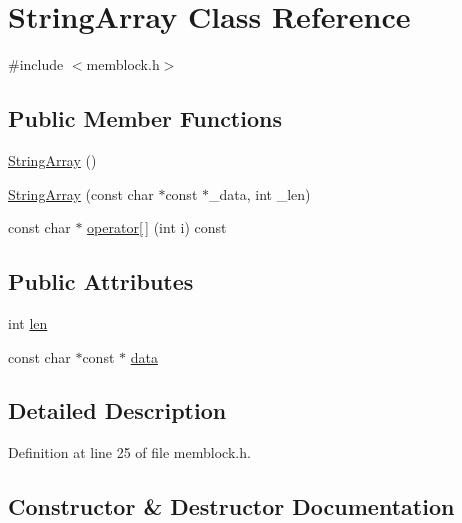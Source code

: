 \hypertarget{class_string_array}{}\section{String\+Array Class Reference}
\label{class_string_array}


{\ttfamily \#include $<$memblock.\+h$>$}

\subsection*{Public Member Functions}
\begin{DoxyCompactItemize}
\item 
\hyperlink{class_string_array_a02f4a1dc1bc63b44c4aeafe174b3b681}{String\+Array} ()
\item 
\hyperlink{class_string_array_acfcc664e8488524390d9e2b9f7eacc60}{String\+Array} (const char $\ast$const $\ast$\+\_\+data, int \+\_\+len)
\item 
const char $\ast$ \hyperlink{class_string_array_a6fdb51881b6ab801341f3735980dc75e}{operator\mbox{[}$\,$\mbox{]}} (int i) const
\end{DoxyCompactItemize}
\subsection*{Public Attributes}
\begin{DoxyCompactItemize}
\item 
int \hyperlink{class_string_array_a55666d8937557c4f6f0c9ac4a1c16194}{len}
\item 
const char $\ast$const  $\ast$ \hyperlink{class_string_array_a025f3f4f9a33f02b15e472782137d4ba}{data}
\end{DoxyCompactItemize}


\subsection{Detailed Description}


Definition at line 25 of file memblock.\+h.



\subsection{Constructor \& Destructor Documentation}
\mbox{\label{class_string_array_a02f4a1dc1bc63b44c4aeafe174b3b681}} 
